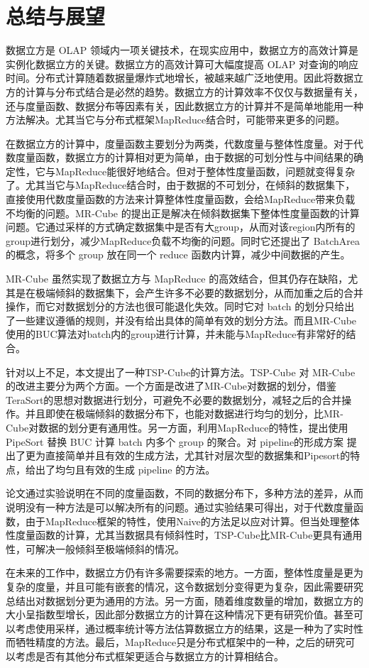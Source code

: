 
\chapter{总结与展望}

数据立方是 OLAP 领域内一项关键技术，在现实应用中，数据立方的高效计算是实例化数据立方的关键。数据立方的高效计算可大幅度提高 OLAP 对查询的响应时间。分布式计算随着数据量爆炸式地增长，被越来越广泛地使用。因此将数据立方的计算与分布式结合是必然的趋势。数据立方的计算效率不仅仅与数据量有关，还与度量函数、数据分布等因素有关，因此数据立方的计算并不是简单地能用一种方法解决。尤其当它与分布式框架MapReduce结合时，可能带来更多的问题。

在数据立方的计算中，度量函数主要划分为两类，代数度量与整体性度量。对于代数度量函数，数据立方的计算相对更为简单，由于数据的可划分性与中间结果的确定性，它与MapReduce能很好地结合。但对于整体性度量函数，问题就变得复杂了。尤其当它与MapReduce结合时，由于数据的不可划分，在倾斜的数据集下，直接使用代数度量函数的方法来计算整体性度量函数，会给MapReduce带来负载不均衡的问题。MR-Cube 的提出正是解决在倾斜数据集下整体性度量函数的计算问题。它通过采样的方式确定数据集中是否有大group，从而对该region内所有的group进行划分，减少MapReduce负载不均衡的问题。同时它还提出了 BatchArea 的概念，将多个 group 放在同一个 reduce 函数内计算，减少中间数据的产生。

MR-Cube 虽然实现了数据立方与 MapReduce 的高效结合，但其仍存在缺陷，尤其是在极端倾斜的数据集下，会产生许多不必要的数据划分，从而加重之后的合并操作，而它对数据划分的方法也很可能退化失效。同时它对 batch 的划分只给出了一些建议遵循的规则，并没有给出具体的简单有效的划分方法。而且MR-Cube使用的BUC算法对batch内的group进行计算，并未能与MapReduce有非常好的结合。

针对以上不足，本文提出了一种TSP-Cube的计算方法。TSP-Cube 对 MR-Cube的改进主要分为两个方面。一个方面是改进了MR-Cube对数据的划分，借鉴TeraSort的思想对数据进行划分，可避免不必要的数据划分，减轻之后的合并操作。并且即使在极端倾斜的数据分布下，也能对数据进行均匀的划分，比MR-Cube对数据的划分更有通用性。另一方面，利用MapReduce的特性，提出使用 PipeSort 替换 BUC 计算 batch 内多个 group 的聚合。对 pipeline的形成方案 提出了更为直接简单并且有效的生成方法，尤其针对层次型的数据集和Pipesort的特点，给出了均匀且有效的生成 pipeline 的方法。

论文通过实验说明在不同的度量函数，不同的数据分布下，多种方法的差异，从而说明没有一种方法是可以解决所有的问题。通过实验结果可得出，对于代数度量函数，由于MapReduce框架的特性，使用Naive的方法足以应对计算。但当处理整体性度量函数的计算，尤其当数据具有倾斜性时，TSP-Cube比MR-Cube更具有通用性，可解决一般倾斜至极端倾斜的情况。

在未来的工作中，数据立方仍有许多需要探索的地方。一方面，整体性度量是更为复杂的度量，并且可能有嵌套的情况，这令数据划分变得更为复杂，因此需要研究总结出对数据划分更为通用的方法。另一方面，随着维度数量的增加，数据立方的大小呈指数型增长，因此部分数据立方的计算在这种情况下更有研究价值。甚至可以考虑使用采样，通过概率统计等方法估算数据立方的结果，这是一种为了实时性而牺牲精度的方法。最后，MapReduce只是分布式框架中的一种，之后的研究可以考虑是否有其他分布式框架更适合与数据立方的计算相结合。
